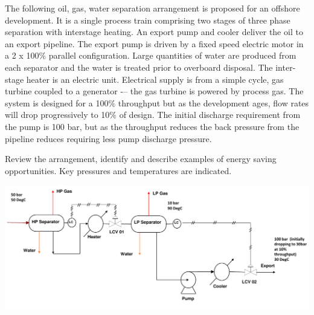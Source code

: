 \documentclass[calculator,datasheet,solutions]{exam}
\begin{document}
\begin{question} 

The following oil, gas, water separation arrangement is proposed for an offshore development. It is a single process train comprising two stages of three phase separation with interstage heating. An export pump and cooler deliver the oil to an export pipeline. The export pump is driven by a fixed speed electric motor in a 2 x 100$\%$ parallel configuration. Large quantities of water are produced from each separator and the water is treated prior to overboard disposal. The inter-stage heater is an electric unit. Electrical supply is from a simple cycle, gas turbine coupled to a generator -– the gas turbine is powered by process gas. The system is designed for a 100$\%$ throughput but as the development ages, flow rates will drop progressively to 10$\%$ of design.  The initial discharge requirement from the pump is 100 bar, but as the throughput reduces the back pressure from the pipeline reduces requiring less pump discharge pressure.

Review the arrangement, identify and describe examples of energy saving opportunities. Key pressures and temperatures are indicated.~
\begin{center}
\includegraphics[width=\columnwidth]{./Pics/EG5597_Process_1_May_2014-5.pdf}
\end{center} 


\end{question}

\clearpage
\end{document}
